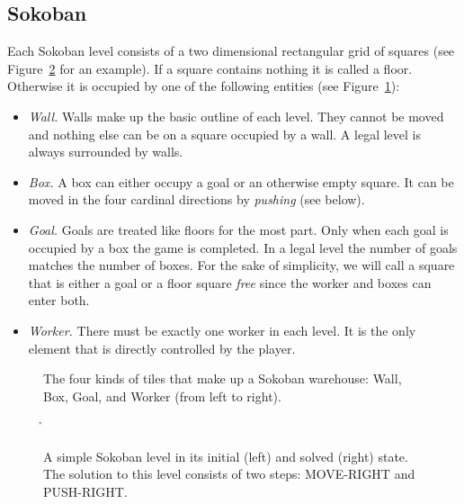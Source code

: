 \documentclass[runningheads]{llncs}
\begin{document}
\subsection{Sokoban}

Each Sokoban level consists of a two dimensional rectangular grid of squares
(see Figure~\ref{fig-basic-level} for an example).
If a square contains nothing it is called a floor. Otherwise it is occupied by
one of the following entities (see Figure~\ref{fig-tiles}):
\vspace{-3pt}
\begin{itemize}
\item \emph{Wall.} Walls make up the basic outline of each level. They cannot be
  moved and nothing else can be on a square occupied by a wall. A legal level is
  always surrounded by walls.
\item \emph{Box.} A box can either occupy a goal or an otherwise empty square. It can be
  moved in the four cardinal directions by \emph{pushing} (see below).
\item  \emph{Goal.} Goals are treated like floors for the most part. Only when
  each goal is occupied by a box the game is completed. In a legal level the
  number of goals matches the number of boxes. For the sake of simplicity, we
  will call a square that is either a goal or a floor square \emph{free} since
  the worker and boxes can enter both.
\item \emph{Worker.} There must be exactly one worker in each level.
  It is the only element that is directly controlled by the player.
\end{itemize}

\begin{figure}
\centering
\w\e\x\e\g\e\p\n
\caption{The four kinds of tiles that make up a Sokoban warehouse: Wall, Box, Goal, and Worker (from left to right).}
\label{fig-tiles}
\end{figure}


\begin{figure}
\centering
\w\w\w\w\w\w\e\w\w\w\w\w\w\n
\w\p\e\x\g\w\e\w\e\e\p\h\w\n
\w\w\w\w\w\w\e\w\w\w\w\w\w\n
\caption{A simple Sokoban level in its initial (left) and solved (right) state.
The solution to this level consists of two steps: MOVE-RIGHT and PUSH-RIGHT.}
\label{fig-basic-level}
\end{figure}
\end{document}
